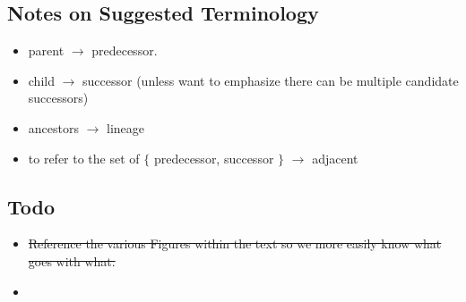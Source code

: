 \subsection{Notes on Suggested Terminology}
\begin{itemize}
\item parent $\rightarrow$ predecessor.
\item child $\rightarrow$ successor (unless want to emphasize there can be multiple candidate successors)
\item ancestors $\rightarrow$ lineage
\item to refer to the set of $\{$ predecessor, successor $\}$ $\rightarrow$ adjacent
\end{itemize}


\subsection{Todo}
\begin{itemize}
\item \sout{Reference the various Figures within the text so we more easily know what goes with what.}
\item {}
\end{itemize}
